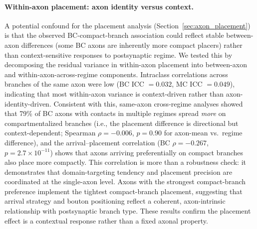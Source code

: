 \documentclass[11pt]{article}
\begin{document}
\paragraph{Within-axon placement: axon identity versus context.}
A potential confound for the placement analysis (Section~\ref{sec:axon_placement}) is that the observed BC-compact-branch association could reflect stable between-axon differences (some BC axons are inherently more compact placers) rather than context-sensitive responses to postsynaptic regime. We tested this by decomposing the residual variance in within-axon placement into between-axon and within-axon-across-regime components. Intraclass correlations across branches of the same axon were low (BC ICC $= 0.032$, MC ICC $= 0.049$), indicating that most within-axon variance is context-driven rather than axon-identity-driven. Consistent with this, same-axon cross-regime analyses showed that 79\% of BC axons with contacts in multiple regimes spread \textit{more} on compartmentalized branches (i.e., the placement difference is directional but context-dependent; Spearman $\rho = -0.006$, $p = 0.90$ for axon-mean vs.\ regime difference), and the arrival--placement correlation (BC $\rho = -0.267$, $p = 2.7 \times 10^{-11}$) shows that axons arriving preferentially on compact branches also place more compactly. This correlation is more than a robustness check: it demonstrates that domain-targeting tendency and placement precision are coordinated at the single-axon level. Axons with the strongest compact-branch preference implement the tightest compact-branch placement, suggesting that arrival strategy and bouton positioning reflect a coherent, axon-intrinsic relationship with postsynaptic branch type. These results confirm the placement effect is a contextual response rather than a fixed axonal property.
\end{document}
